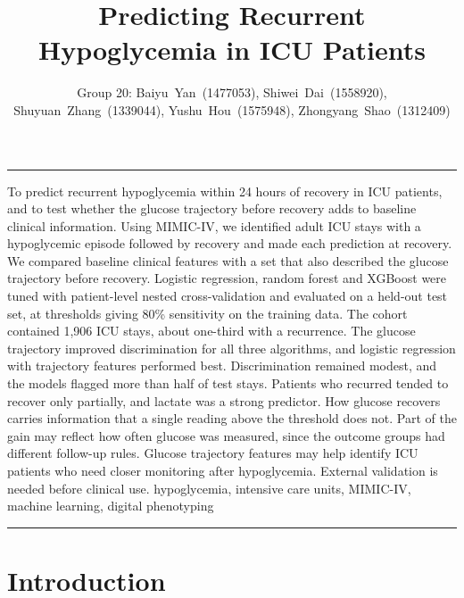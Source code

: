 \documentclass[twocolumn, 8pt]{article}
\title{Predicting Recurrent Hypoglycemia in ICU Patients}
\author{Group 20: Baiyu~Yan~(1477053), Shiwei~Dai~(1558920), Shuyuan~Zhang~(1339044), Yushu~Hou~(1575948), Zhongyang~Shao~(1312409)}
\affil{School of Computing and Information Systems, The University of Melbourne, Australia}
\date{}
\begin{document}
\par\noindent\rule[-7pt]{15.5cm}{0.2em}
\begin{strip}
    \begin{minipage}{.88\textwidth}
        \maketitle
        \small

        \abstractSection
        {To predict recurrent hypoglycemia within 24 hours of recovery in ICU patients, and to test whether the glucose trajectory before recovery adds to baseline clinical information.} %
        {Using MIMIC-IV, we identified adult ICU stays with a hypoglycemic episode followed by recovery and made each prediction at recovery. We compared baseline clinical features with a set that also described the glucose trajectory before recovery. Logistic regression, random forest and XGBoost were tuned with patient-level nested cross-validation and evaluated on a held-out test set, at thresholds giving 80\% sensitivity on the training data.} %
        {The cohort contained 1,906 ICU stays, about one-third with a recurrence. The glucose trajectory improved discrimination for all three algorithms, and logistic regression with trajectory features performed best. Discrimination remained modest, and the models flagged more than half of test stays. Patients who recurred tended to recover only partially, and lactate was a strong predictor.} %
        {How glucose recovers carries information that a single reading above the threshold does not. Part of the gain may reflect how often glucose was measured, since the outcome groups had different follow-up rules.} %
        {Glucose trajectory features may help identify ICU patients who need closer monitoring after hypoglycemia. External validation is needed before clinical use.} %
        {hypoglycemia, intensive care units, MIMIC-IV, machine learning, digital phenotyping} %

        \par\noindent\rule[-7pt]{15.5cm}{0.2em}
        \hspace{2cm}
    \end{minipage}
\end{strip}


\section{Introduction}
\label{sec:intro}
\end{document}
